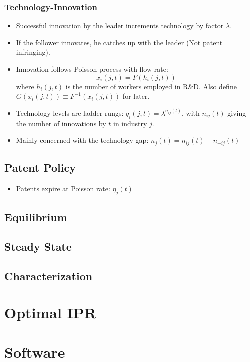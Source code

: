 \documentclass{beamer}
\begin{document}
\begin{frame}[t]\frametitle{Technology-Innovation} 
  \begin{itemize}
    \item Successful innovation by the leader increments technology by factor $\lambda$.
    \item If the follower innovates, he catches up with the leader (Not patent infringing).
    \item Innovation follows Poisson process with flow rate:
      \begin{equation} \label{eq:tech_rd_technology}
        x_i(j, t) = F(h_i(j, t))
      \end{equation}
      where $h_i(j, t)$ is the number of workers employed in R\&D.
      Also define $G(x_i(j,t)) \equiv F^{-1}(x_i(j,t))$ for later.
    \item Technology levels are ladder rungs: $q_i(j, t) = \lambda^{n_{ij}(t)}$, with $n_{ij}(t)$ giving the number of innovations by $t$ in industry $j$.
    \item Mainly concerned with the technology gap: $n_j(t) = n_{ij}(t) - n_{-ij}(t)$
  \end{itemize}

\subsection{Patent Policy}
\label{sub:patent_policy}
  \begin{itemize}
    \item Patents expire at Poisson rate: $\eta_j(t)$
  \end{itemize}

\end{frame}

\subsection{Equilibrium}
\label{sub:equilibrium}

\subsection{Steady State}
\label{sub:steady_state}

\subsection{Characterization}
\label{sub:characterization}

\section{Optimal IPR}
\label{sec:optimal_ipr}


\section{Software}
\label{sec:software}
\end{document}
